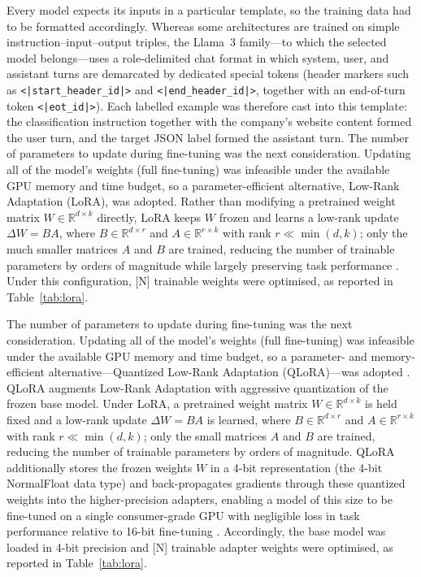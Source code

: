 \documentclass[runningheads]{llncs}
\begin{document}
Every model expects its inputs in a particular template, so the training data had to be formatted accordingly. Whereas some architectures are trained on simple instruction--input--output triples, the Llama~3 family---to which the selected model belongs---uses a role-delimited chat format in which system, user, and assistant turns are demarcated by dedicated special tokens (header markers such as \verb!<|start_header_id|>! and \verb!<|end_header_id|>!, together with an end-of-turn token \verb!<|eot_id|>!). Each labelled example was therefore cast into this template: the classification instruction together with the company's website content formed the user turn, and the target JSON label formed the assistant turn. The number of parameters to update during fine-tuning was the next consideration. Updating all of the model's weights (full fine-tuning) was infeasible under the available GPU memory and time budget, so a parameter-efficient alternative, Low-Rank Adaptation (LoRA), was adopted. Rather than modifying a pretrained weight matrix $W \in \mathbb{R}^{d \times k}$ directly, LoRA keeps $W$ frozen and learns a low-rank update $\Delta W = BA$, where $B \in \mathbb{R}^{d \times r}$ and $A \in \mathbb{R}^{r \times k}$ with rank $r \ll \min(d,k)$; only the much smaller matrices $A$ and $B$ are trained, reducing the number of trainable parameters by orders of magnitude while largely preserving task performance \citep{hu2021lora}. Under this configuration, [N] trainable weights were optimised, as reported in Table~\ref{tab:lora}.

The number of parameters to update during fine-tuning was the next consideration. Updating all of the model's weights (full fine-tuning) was infeasible under the available GPU memory and time budget, so a parameter- and memory-efficient alternative---Quantized Low-Rank Adaptation (QLoRA)---was adopted \citep{dettmers2023qlora}. QLoRA augments Low-Rank Adaptation \citep[LoRA;][]{hu2021lora} with aggressive quantization of the frozen base model. Under LoRA, a pretrained weight matrix $W \in \mathbb{R}^{d \times k}$ is held fixed and a low-rank update $\Delta W = BA$ is learned, where $B \in \mathbb{R}^{d \times r}$ and $A \in \mathbb{R}^{r \times k}$ with rank $r \ll \min(d,k)$; only the small matrices $A$ and $B$ are trained, reducing the number of trainable parameters by orders of magnitude. QLoRA additionally stores the frozen weights $W$ in a 4-bit representation (the 4-bit NormalFloat data type) and back-propagates gradients through these quantized weights into the higher-precision adapters, enabling a model of this size to be fine-tuned on a single consumer-grade GPU with negligible loss in task performance relative to 16-bit fine-tuning \citep{dettmers2023qlora}. Accordingly, the base model was loaded in 4-bit precision and [N] trainable adapter weights were optimised, as reported in Table~\ref{tab:lora}.
\end{document}
